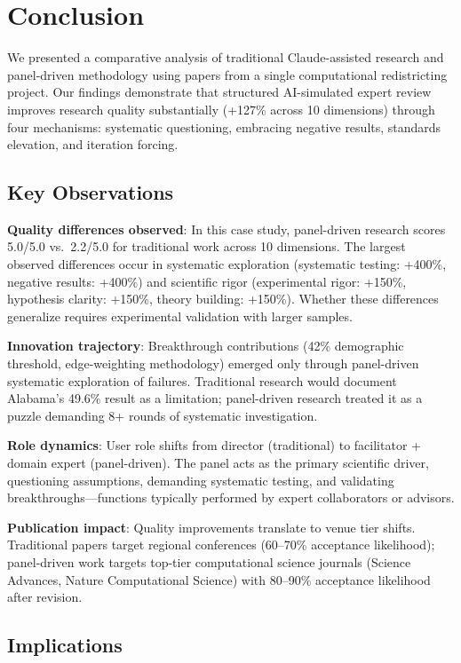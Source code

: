 \section{Conclusion}
\label{sec:conclusion}

We presented a comparative analysis of traditional Claude-assisted research and panel-driven methodology using papers from a single computational redistricting project. Our findings demonstrate that structured AI-simulated expert review improves research quality substantially (+127\% across 10 dimensions) through four mechanisms: systematic questioning, embracing negative results, standards elevation, and iteration forcing.

\subsection{Key Observations}

\textbf{Quality differences observed}: In this case study, panel-driven research scores 5.0/5.0 vs.\ 2.2/5.0 for traditional work across 10 dimensions. The largest observed differences occur in systematic exploration (systematic testing: +400\%, negative results: +400\%) and scientific rigor (experimental rigor: +150\%, hypothesis clarity: +150\%, theory building: +150\%). Whether these differences generalize requires experimental validation with larger samples.

\textbf{Innovation trajectory}: Breakthrough contributions (42\% demographic threshold, edge-weighting methodology) emerged only through panel-driven systematic exploration of failures. Traditional research would document Alabama's 49.6\% result as a limitation; panel-driven research treated it as a puzzle demanding 8+ rounds of systematic investigation.

\textbf{Role dynamics}: User role shifts from director (traditional) to facilitator + domain expert (panel-driven). The panel acts as the primary scientific driver, questioning assumptions, demanding systematic testing, and validating breakthroughs---functions typically performed by expert collaborators or advisors.

\textbf{Publication impact}: Quality improvements translate to venue tier shifts. Traditional papers target regional conferences (60--70\% acceptance likelihood); panel-driven work targets top-tier computational science journals (Science Advances, Nature Computational Science) with 80--90\% acceptance likelihood after revision.

\subsection{Implications}

